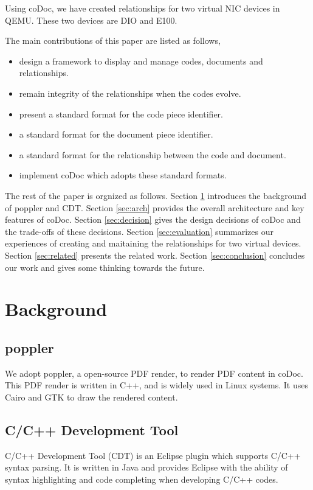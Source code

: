 \documentclass[11pt,letterpaper,oneside]{article}
\begin{document}
Using coDoc, we have created relationships for two virtual NIC devices in QEMU.
These two devices are DIO and E100.

The main contributions of this paper are listed as follows,
\begin{itemize}
\item design a framework to display and manage codes, documents and relationships.
\item remain integrity of the relationships when the codes evolve.
\item present a standard format for the code piece identifier.
\item a standard format for the document piece identifier.
\item a standard format for the relationship between the code and document.
\item implement coDoc which adopts these standard formats.
\end{itemize}

The rest of the paper is orgnized as follows. 
Section \ref{sec:background} introduces the background of poppler and CDT.
Section \ref{sec:arch} provides the overall architecture and key features of coDoc.
Section \ref{sec:decision} gives the design decisions of coDoc and the trade-offs of these decisions.
Section \ref{sec:evaluation} summarizes our experiences of creating and maitaining the relationships for two virtual devices.
Section \ref{sec:related} presents the related work.
Section \ref{sec:conclusion} concludes our work and gives some thinking towards the future.


\section{Background}
\label{sec:background}
\subsection{poppler}
We adopt poppler, a open-source PDF render, to render PDF content in coDoc.
This PDF render is written in C++, 
and is widely used in Linux systems.
It uses Cairo and GTK to draw the rendered content.

\subsection{C/C++ Development Tool}
C/C++ Development Tool (CDT) is an Eclipse plugin which supports C/C++ syntax parsing.
It is written in Java and provides Eclipse with the ability of syntax highlighting and code completing when developing C/C++ codes.
\end{document}
